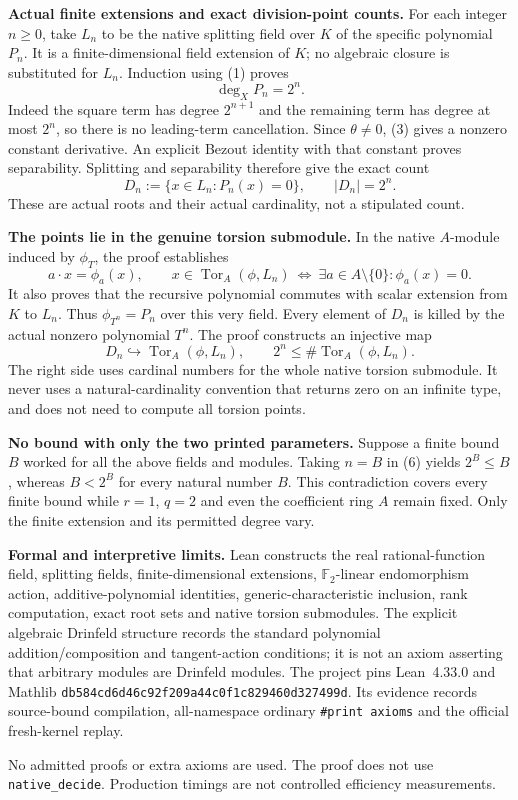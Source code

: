 \documentclass[10pt,a4paper]{article}
\begin{document}
\newpage
\textbf{Actual finite extensions and exact division-point counts.}
For each integer $n\ge0$, take $L_n$ to be the native splitting field
over $K$ of the specific polynomial $P_n$. It is a finite-dimensional
field extension of $K$; no algebraic closure is substituted for $L_n$.
Induction using (1) proves
\[
 \deg_X P_n=2^n. \tag{4}
\]
Indeed the square term has degree $2^{n+1}$ and the remaining term has
degree at most $2^n$, so there is no leading-term cancellation.
Since $\theta\ne0$, (3) gives a nonzero constant derivative.
An explicit Bezout identity with that constant proves separability.
Splitting and separability therefore give the exact count
\[
 D_n:=\{x\in L_n:P_n(x)=0\},\qquad |D_n|=2^n. \tag{5}
\]
These are actual roots and their actual cardinality, not a stipulated count.

\textbf{The points lie in the genuine torsion submodule.}
In the native $A$-module induced by $\phi_T$, the proof establishes
\[
 a\cdot x=\phi_a(x),\qquad
 x\in\operatorname{Tor}_A(\phi,L_n)
 \ \Longleftrightarrow\ 
 \exists a\in A\setminus\{0\}:\phi_a(x)=0.
\]
It also proves that the recursive polynomial commutes with scalar
extension from $K$ to $L_n$. Thus $\phi_{T^n}=P_n$ over this very field.
Every element of $D_n$ is killed by the actual nonzero polynomial $T^n$.
The proof constructs an injective map
\[
 D_n\hookrightarrow\operatorname{Tor}_A(\phi,L_n),
 \qquad
 2^n\le\#\operatorname{Tor}_A(\phi,L_n). \tag{6}
\]
The right side uses cardinal numbers for the whole native torsion
submodule. It never uses a natural-cardinality convention that returns
zero on an infinite type, and does not need to compute all torsion points.

\textbf{No bound with only the two printed parameters.}
Suppose a finite bound $B$ worked for all the above fields and modules.
Taking $n=B$ in (6) yields $2^B\le B$, whereas $B<2^B$ for every
natural number $B$. This contradiction covers every finite bound while
$r=1$, $q=2$ and even the coefficient ring $A$ remain fixed. Only the
finite extension and its permitted degree vary.

\textbf{Formal and interpretive limits.}
Lean constructs the real rational-function field, splitting fields,
finite-dimensional extensions, $\mathbb F_2$-linear endomorphism action,
additive-polynomial identities, generic-characteristic inclusion,
rank computation, exact root sets and native torsion submodules.
The explicit algebraic Drinfeld structure records the standard polynomial
addition/composition and tangent-action conditions; it is not an axiom
asserting that arbitrary modules are Drinfeld modules.
The project pins Lean~4.33.0 and Mathlib
\texttt{db584cd6d46c92f209a44c0f1c829460d327499d}.
Its evidence records source-bound compilation, all-namespace ordinary
\texttt{\#print axioms} and the official fresh-kernel replay.
\par No admitted proofs or extra axioms are used. The proof does not use
\texttt{native\_decide}.
Production timings are not controlled efficiency measurements.
\end{document}
